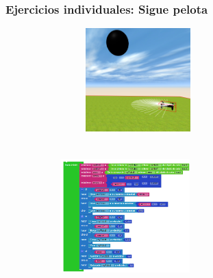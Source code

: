 \documentclass[xcolor={table}]{beamer}
\begin{document}
		\begin{frame}
			\frametitle{Ejercicios individuales: Sigue pelota}
        \begin{figure}[H]
        \centering
        \begin{subfigure}{\textwidth}
            \includegraphics[width=6cm, height=4cm]{img/followBallTello12.png}
        \label{fig:followBall}
        \end{subfigure}\hfill
        \begin{subfigure}{\textwidth}
            \includegraphics[width=5cm, height=5.5cm]{img/siguepelotacodigo.png}
        \label{fig:siguepelotacodigo}
        \end{subfigure}\hfill
        \label{fig:siguepelota}
        \end{figure}
 		\end{frame}
	
\end{document}
